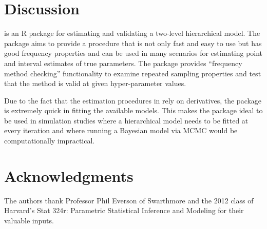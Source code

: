 \documentclass[article]{jss}
\begin{document}


\section[Discussion]{Discussion}
 is an R package for estimating and validating a two-level hierarchical model. The package aims to provide a procedure that is not only fast and easy to use but has good frequency properties and can be used in many scenarios for estimating point and interval estimates of true parameters. The package provides ``frequency method checking'' functionality to examine repeated sampling properties and test that the method is valid at given hyper-parameter values.


Due to the fact that the estimation procedures in  rely on derivatives, the package is extremely quick in fitting the available models. This makes the package ideal to be used in simulation studies where a hierarchical model needs to be fitted at every iteration and where running a Bayesian model via MCMC would be computationally impractical.

\section[acknowledgments]{Acknowledgments}
The authors thank Professor Phil Everson of Swarthmore and the 2012 class of Harvard's Stat 324r: Parametric Statistical Inference and Modeling for their valuable inputs.


\end{document}
